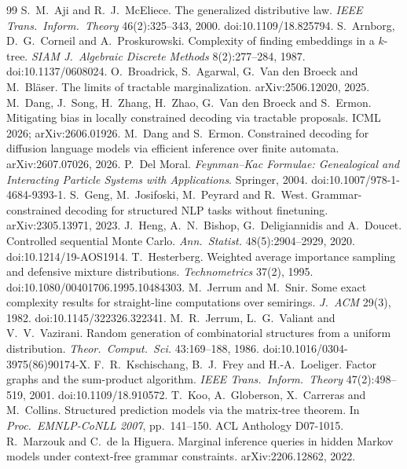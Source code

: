 \documentclass[11pt]{article}
\theoremstyle{definition}
\begin{document}
\begin{thebibliography}{99}\small
{} S.~M.~Aji and R.~J.~McEliece. The generalized distributive law. \emph{IEEE Trans.\ Inform.\ Theory} 46(2):325--343, 2000. doi:10.1109/18.825794.
 S.~Arnborg, D.~G.~Corneil and A.~Proskurowski. Complexity of finding embeddings in a $k$-tree. \emph{SIAM J.\ Algebraic Discrete Methods} 8(2):277--284, 1987. doi:10.1137/0608024.
 O.~Broadrick, S.~Agarwal, G.~Van den Broeck and M.~Bl\"aser. The limits of tractable marginalization. arXiv:2506.12020, 2025.
 M.~Dang, J.~Song, H.~Zhang, H.~Zhao, G.~Van den Broeck and S.~Ermon. Mitigating bias in locally constrained decoding via tractable proposals. ICML 2026; arXiv:2606.01926.
 M.~Dang and S.~Ermon. Constrained decoding for diffusion language models via efficient inference over finite automata. arXiv:2607.07026, 2026.
 P.~Del Moral. \emph{Feynman--Kac Formulae: Genealogical and Interacting Particle Systems with Applications}. Springer, 2004. doi:10.1007/978-1-4684-9393-1.
 S.~Geng, M.~Josifoski, M.~Peyrard and R.~West. Grammar-constrained decoding for structured NLP tasks without finetuning. arXiv:2305.13971, 2023.
 J.~Heng, A.~N.~Bishop, G.~Deligiannidis and A.~Doucet. Controlled sequential Monte Carlo. \emph{Ann.\ Statist.} 48(5):2904--2929, 2020. doi:10.1214/19-AOS1914.
 T.~Hesterberg. Weighted average importance sampling and defensive mixture distributions. \emph{Technometrics} 37(2), 1995. doi:10.1080/00401706.1995.10484303.
 M.~Jerrum and M.~Snir. Some exact complexity results for straight-line computations over semirings. \emph{J.\ ACM} 29(3), 1982. doi:10.1145/322326.322341.
 M.~R.~Jerrum, L.~G.~Valiant and V.~V.~Vazirani. Random generation of combinatorial structures from a uniform distribution. \emph{Theor.\ Comput.\ Sci.} 43:169--188, 1986. doi:10.1016/0304-3975(86)90174-X.
 F.~R.~Kschischang, B.~J.~Frey and H.-A.~Loeliger. Factor graphs and the sum-product algorithm. \emph{IEEE Trans.\ Inform.\ Theory} 47(2):498--519, 2001. doi:10.1109/18.910572.
 T.~Koo, A.~Globerson, X.~Carreras and M.~Collins. Structured prediction models via the matrix-tree theorem. In \emph{Proc.\ EMNLP-CoNLL 2007}, pp.~141--150. ACL Anthology D07-1015.
 R.~Marzouk and C.~de la Higuera. Marginal inference queries in hidden Markov models under context-free grammar constraints. arXiv:2206.12862, 2022.

\end{thebibliography}
\end{document}
